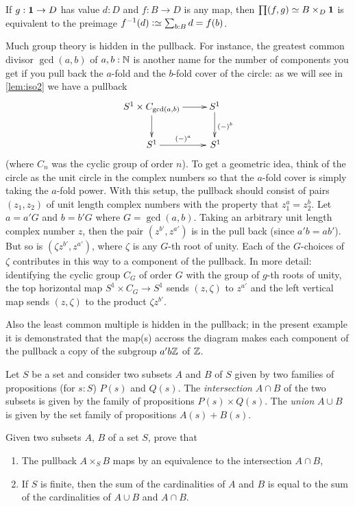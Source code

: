 \begin{example}
  If $g:\mathbf{1}\to D$ has value $d:D$ and $f:B\to D$ is any map, then $\prod(f,g)\oldequiv B\times_D\bn 1$ is equivalent to the preimage $f^{-1}(d)\defequi\sum_{b:B}d=f(b)$.
\end{example}
\begin{example}
  \label{ex:pullbackandgcd}
  Much group theory is hidden in the pullback.  For instance, the greatest common divisor $\gcd(a,b)$ of $a,b:\mathbb{N}$ is another name for the number of components you get if you pull back the $a$-fold and the $b$-fold cover of the circle: as we will see in \cref{lem:iso2} we have a pullback
$$\xymatrix{S^1\times C_{\gcd(a,b)}\ar[d]\ar[r]& S^1\ar[d]^{(-)^b}\\
S^1\ar[r]^{(-)^a}&\,S^1}
$$ 
(where $C_n$ was the cyclic group of order $n$).
To get a geometric idea, think of the circle as the unit circle in the complex numbers so that the $a$-fold cover is simply taking the $a$-fold power.  With this setup, the pullback should consist of pairs $(z_1,z_2)$ of unit length complex numbers with the property that $z_1^a=z_2^b$.  Let $a=a'G$ and $b=b'G$ where $G=\gcd(a,b)$. Taking an arbitrary unit length complex number $z$, then the pair $(z^{b'},z^{a'})$ is in the pull back (since $a'b=ab'$).  But so is $(\zeta z^{b'},z^{a'})$, where $\zeta$ is any $G$-th root of unity.  Each of the $G$-choices of $\zeta$ contributes in this way to a component of the pullback.  In more detail: identifying the cyclic group $C_G$ of order $G$ with the group of $g$-th roots of unity, the top horizontal map $S^1\times C_G\to S^1$ sends $(z,\zeta)$ to $z^{a'}$ and the left vertical map sends $(z,\zeta)$ to the product $\zeta z^{b'}$.  

Also the least common multiple is hidden in the pullback; in the present example it is demonstrated that the map(s) accross the diagram makes each component of the pullback a copy of the subgroup $a'b\mathbb{Z}$ of $\mathbb{Z}$.
\end{example}


\begin{definition}
  \label{def:intersectionand unionofsets}
  Let $S$ be a set and consider two subsets $A$ and $B$ of $S$ given by two families of propositions (for $s:S$) $P(s)$ and $Q(s)$.  The \emph{intersection} $A\cap B$ of the two subsets is given by the family of propositions $P(s)\times Q(s)$.  The \emph{union} $A\cup B$ is given by the set family of propositions $A(s)+B(s)$.  
\end{definition}
\begin{xca}
  \label{xca:intersectionpullbackofsets}
  Given two subsets $A$, $B$ of a set $S$, prove that
  \begin{enumerate}
  \item The pullback $A\times_SB$ maps by an equivalence to the intersection $A\cap B$,
  \item\label{xca:cardinalityintersectionunion} 
    If $S$ is finite, then the sum of the cardinalities of $A$ and $B$ is equal to the sum of the cardinalities of $A\cup B$ and $A\cap B$.
  \end{enumerate}
\end{xca}

